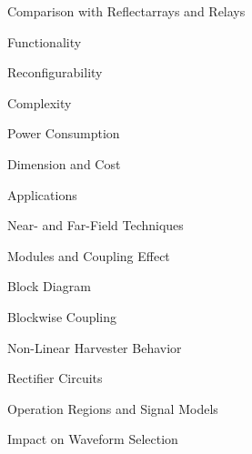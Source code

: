 \begin{section}{}
\begin{subsection}{Comparison with Reflectarrays and Relays}
\begin{subsubsection}{Functionality}
		\end{subsubsection}

		\begin{subsubsection}{Reconfigurability}

		\end{subsubsection}

		\begin{subsubsection}{Complexity}

		\end{subsubsection}

		\begin{subsubsection}{Power Consumption}

		\end{subsubsection}

		\begin{subsubsection}{Dimension and Cost}

		\end{subsubsection}

		\begin{subsubsection}{Applications}

		\end{subsubsection}
	\end{subsection}
\end{section}

\begin{section}{}
	\begin{subsection}{Near- and Far-Field Techniques}

	\end{subsection}

	\begin{subsection}{Modules and Coupling Effect}
		\begin{subsubsection}{Block Diagram}

		\end{subsubsection}

		\begin{subsubsection}{Blockwise Coupling}

		\end{subsubsection}
	\end{subsection}

	\begin{subsection}{Non-Linear Harvester Behavior}
		\begin{subsubsection}{Rectifier Circuits}

		\end{subsubsection}

		\begin{subsubsection}{Operation Regions and Signal Models}

		\end{subsubsection}

		\begin{subsubsection}{Impact on Waveform Selection}

		\end{subsubsection}
	\end{subsection}
\end{section}

